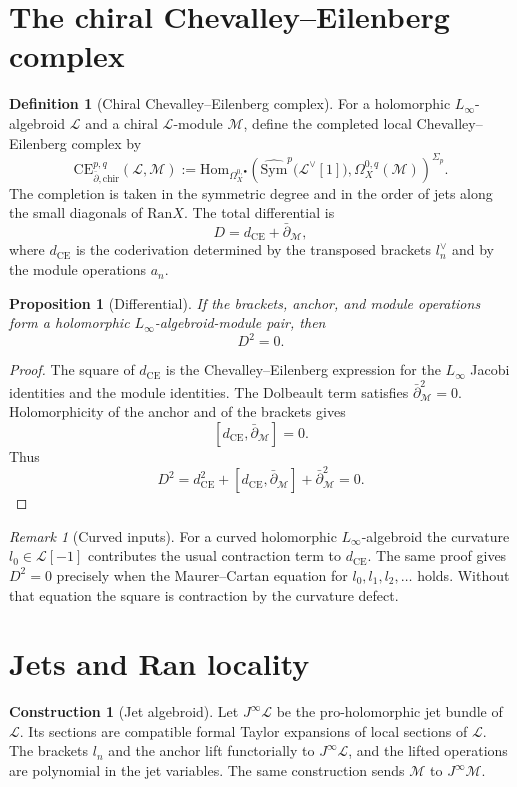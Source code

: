 \documentclass[11pt]{amsart}
\providecommand{\dbar}{\bar{\partial}}
\providecommand{\Sym}{\mathrm{Sym}}
\providecommand{\CE}{\mathrm{CE}}
\providecommand{\chir}{\mathrm{chir}}
\providecommand{\Ran}{\mathrm{Ran}}
\providecommand{\Hom}{\mathrm{Hom}}
\providecommand{\cL}{\mathcal{L}}
\providecommand{\cM}{\mathcal{M}}
\providecommand{\Linf}{L_\infty}
\providecommand{\Jet}{J^\infty}
\theoremstyle{plain}
\newtheorem{proposition}[theorem]{Proposition}
\theoremstyle{definition}
\newtheorem{definition}[theorem]{Definition}
\newtheorem{construction}[theorem]{Construction}
\theoremstyle{remark}
\newtheorem{remark}[theorem]{Remark}
\begin{document}
\section{The chiral Chevalley--Eilenberg complex}

\begin{definition}[Chiral Chevalley--Eilenberg complex]
\label{def:chiral-ce-complex}
For a holomorphic $\Linf$-algebroid $\cL$ and a chiral $\cL$-module
$\cM$, define the completed local Chevalley--Eilenberg complex by
\[
  \CE_{\dbar,\chir}^{p,q}(\cL,\cM)
  :=
  \Hom_{\Omega_X^{0,\bullet}}
  \left(
    \widehat{\Sym}^{p}\bigl(\cL^\vee[1]\bigr),
    \Omega_X^{0,q}(\cM)
  \right)^{\Sigma_p}.
\]
The completion is taken in the symmetric degree and in the order of jets
along the small diagonals of $\Ran X$. The total differential is
\[
  D = d_{\CE}+\dbar_{\cM},
\]
where $d_{\CE}$ is the coderivation determined by the transposed
brackets $l_n^\vee$ and by the module operations $a_n$.
\end{definition}

\begin{proposition}[Differential]\label{prop:D-square-zero}
If the brackets, anchor, and module operations form a holomorphic
$\Linf$-algebroid-module pair, then
\[
  D^2=0.
\]
\end{proposition}

\begin{proof}
The square of $d_{\CE}$ is the Chevalley--Eilenberg expression for the
$\Linf$ Jacobi identities and the module identities. The Dolbeault term
satisfies $\dbar_{\cM}^2=0$. Holomorphicity of the anchor and of the
brackets gives
\[
  [d_{\CE},\dbar_{\cM}]=0.
\]
Thus
\[
  D^2=d_{\CE}^2+[d_{\CE},\dbar_{\cM}]+\dbar_{\cM}^2=0.
\]
\end{proof}

\begin{remark}[Curved inputs]\label{rem:curved-inputs}
For a curved holomorphic $\Linf$-algebroid the curvature
$l_0\in\cL[-1]$ contributes the usual contraction term to $d_{\CE}$.
The same proof gives $D^2=0$ precisely when the Maurer--Cartan equation
for $l_0,l_1,l_2,\ldots$ holds. Without that equation the square is
contraction by the curvature defect.
\end{remark}

\section{Jets and Ran locality}

\begin{construction}[Jet algebroid]\label{constr:jet-algebroid}
Let $\Jet\cL$ be the pro-holomorphic jet bundle of $\cL$. Its sections
are compatible formal Taylor expansions of local sections of $\cL$.
The brackets $l_n$ and the anchor lift functorially to $\Jet\cL$, and
the lifted operations are polynomial in the jet variables. The same
construction sends $\cM$ to $\Jet\cM$.
\end{construction}
\end{document}
